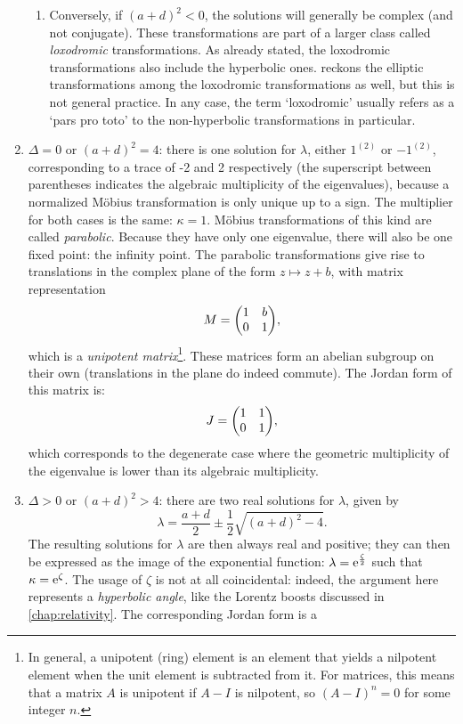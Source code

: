 \begin{enumerate}
\begin{enumerate}
            \item Conversely, if \((a + d)^2 < 0\), the solutions will generally be complex (and not conjugate). These transformations are part of a larger class called \emph{loxodromic} transformations. As already stated, the loxodromic transformations also include the hyperbolic ones. \citet{Needham1997} reckons the elliptic transformations among the loxodromic transformations as well, but this is not general practice. In any case, the term `loxodromic' usually refers as a `pars pro toto' to the non-hyperbolic transformations in particular.
        \end{enumerate}
    \item \(\Delta = 0\) or \((a + d)^2 = 4\): there is one solution for \(\lambda\), either \(1^{(2)}\) or \(-1^{(2)}\), corresponding to a trace of -2 and 2 respectively (the superscript between parentheses indicates the algebraic multiplicity of the eigenvalues), because a normalized Möbius transformation is only unique up to a sign. The multiplier for both cases is the same: \(\kappa = 1\). Möbius transformations of this kind are called \emph{parabolic}. Because they have only one eigenvalue, there will also be one fixed point: the infinity point. The parabolic transformations give rise to translations in the complex plane of the form \(z \mapsto z + b\), with matrix representation
    \[ M = \mqty(1 & b \\ 0 & 1 ), \]
    which is a \emph{unipotent matrix}\footnote{In general, a unipotent (ring) element is an element that yields a nilpotent element when the unit element is subtracted from it. For matrices, this means that a matrix \(A\) is unipotent if \(A - I\) is nilpotent, so \((A - I)^n = 0\) for some integer \(n\).}. These matrices form an abelian subgroup on their own (translations in the plane do indeed commute). The Jordan form of this matrix is:
    \[ J = \mqty( 1 & 1 \\ 0 & 1 ), \]
    which corresponds to the degenerate case where the geometric multiplicity of the eigenvalue is lower than its algebraic multiplicity.
    \item \(\Delta > 0\) or \((a + d)^2 > 4\): there are two real solutions for \(\lambda\), given by
        \[ \lambda = \frac{a + d}{2} \pm \frac{1}{2}\sqrt{(a + d)^2 - 4}. \]
        The resulting solutions for \(\lambda\) are then always real and positive; they can then be expressed as the image of the exponential function: \(\lambda = \mathrm{e}^{\frac{\zeta}{2}}\) such that \(\kappa = \mathrm{e}^{\zeta}\). The usage of \(\zeta\) is not at all coincidental: indeed, the argument here represents a \emph{hyperbolic angle}, like the Lorentz boosts discussed in \cref{chap:relativity}. The corresponding Jordan form is a 

\end{enumerate}
